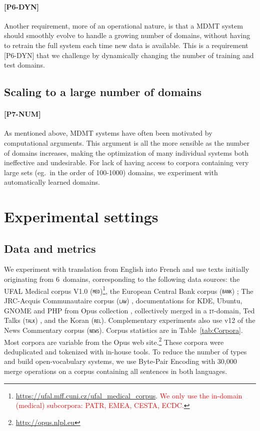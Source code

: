 \documentclass[11pt,a4paper]{article}
\newcommand{\fyTodo}[1]{\Todo[FY:]{\textcolor{orange}{#1}}}
\newcommand{\fyFuture}[1]{\done[FY]\Todo[FY:]{\textcolor{red}{#1}}}
\newcommand{\revision}[1]{\textcolor{red}{#1}}
\newcommand{\domain}[1]{\texttt{\textsc{#1}}}
\begin{document}
\paragraph{[P6-DYN]}
Another requirement, more of an operational nature, is that a MDMT system should smoothly evolve to handle a growing number of domains, without having to retrain the full system each time new data is available. This is a requirement [P6-DYN] that we challenge by dynamically changing the number of training and test domains.

\subsection{Scaling to a large number of domains \label{ssec:scaling}}

\paragraph{[P7-NUM]} As mentioned above, MDMT systems have often been motivated by computational arguments. This argument is all the more sensible as the number of domains increases, making the optimization of many individual systems both ineffective and undesirable. For lack of having access to corpora containing very large sets (eg.\ in the order of 100-1000) domains, we experiment with automatically learned domains.\fyFuture{considering a varying number of clusters.}

\section{Experimental settings \label{sec:experiments}}

\subsection{Data and metrics \label{ssec:corpora}}

We experiment with translation from English into French and use texts initially originating from 6~domains, corresponding to the following data sources: the UFAL Medical corpus V1.0 (\domain{med})\footnote{\url{https://ufal.mff.cuni.cz/ufal_medical_corpus}. \revision{We only use the in-domain (medical) subcorpora: PATR, EMEA, CESTA, ECDC.}}, the European Central Bank corpus (\domain{bank}) \cite{Tiedemann12parallel}; The JRC-Acquis Communautaire corpus (\domain{law}) \cite{Steinberger06acquis}, documentations for KDE, Ubuntu, GNOME and PHP from Opus collection \cite{Tiedemann09news}, collectively merged in a \domain{it}-domain, Ted Talks (\domain{talk}) \cite{Cettolo12wit}, and the Koran (\domain{rel}). Complementary experiments also use v12 of the News Commentary corpus (\domain{news}). Corpus statistics are in Table~\ref{tab:Corpora}.  Most corpora are variable from the Opus web site.\footnote{\url{http://opus.nlpl.eu}} These corpora were deduplicated and tokenized with in-house tools. To reduce the number of types and build open-vocabulary systems, we use Byte-Pair Encoding \cite{Sennrich16BPE} with 30,000 merge operations on a corpus containing all sentences in both languages.\fyTodo{Add \# number of tokens, also specificity ?}%
\end{document}
